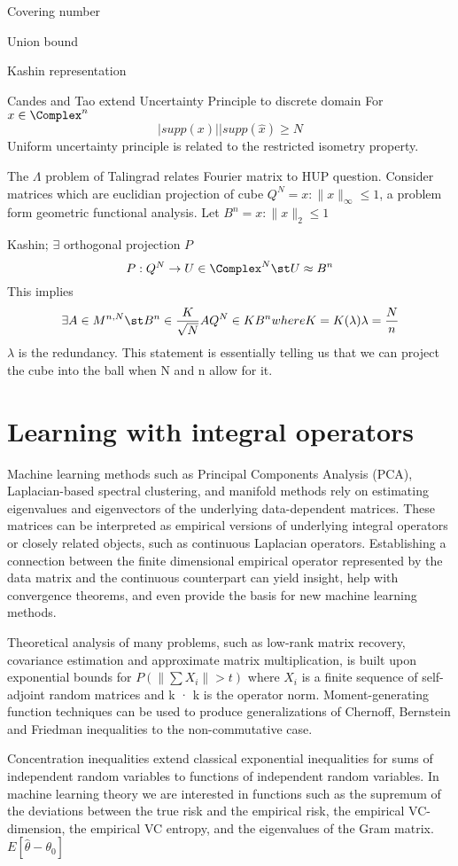 Covering number

Union bound

Kashin representation

Candes and Tao extend Uncertainty Principle to discrete domain
For $x \in \Complex^n$
\begin{equation*}
  |supp(x)| |supp(\hat{x}) \geq N
\end{equation*}
Uniform uncertainty principle is related to the restricted isometry property.

The $\Lambda$ problem of Talingrad relates Fourier matrix to HUP question.  Consider matrices which are euclidian projection of cube $Q^N = {x : \parallel x \parallel_\infty  \leq 1}$, a problem form geometric functional analysis.  Let $B^n = {x : \parallel x \parallel_2  \leq 1}$

Kashin; $\exists$ orthogonal projection $P$
\begin{equation*}
  P : Q^N \rightarrow U \in \Complex^N \st U \approx B^n
\end{equation*}
This implies
\begin{equation*}
  \exists A \in M^{n,N} \st B^n \in \frac{K}{\sqrt{N}} A Q^N \in K B^n where K = K(\lambda) \lambda=\frac{N}{n}
\end{equation*}
$\lambda$ is the redundancy.  This statement is essentially telling us that we can project the cube into the ball when N and n allow for it.

\section*{Learning with integral operators}
Machine learning methods such as Principal Components Analysis (PCA), Laplacian-based spectral clustering, and manifold methods rely on estimating eigenvalues and eigenvectors of the underlying data-dependent matrices.  These matrices can be interpreted as empirical versions of underlying integral operators or closely related objects, such as continuous Laplacian operators.  Establishing a connection between the finite dimensional empirical operator represented by the data matrix and the continuous counterpart can yield insight, help with convergence theorems, and even provide the basis for new machine learning methods.

Theoretical analysis of many problems, such as low-rank matrix recovery, covariance estimation and approximate matrix multiplication, is built upon exponential bounds for $P(\| \sum X_i \| > t)$ where ${X_i}$ is a finite sequence of self-adjoint random matrices and k · k is the operator norm. Moment-generating function techniques can be used to produce generalizations of Chernoff, Bernstein and Friedman inequalities to the non-commutative case.

Concentration inequalities extend classical exponential inequalities for sums of independent random variables to functions of independent random variables.  In machine learning theory we are interested in functions such as the supremum of the deviations between the true risk and the empirical risk, the empirical VC-dimension, the empirical VC entropy, and the eigenvalues of the Gram matrix.
$E[ \hat{\theta} - \theta_0 ]$ 